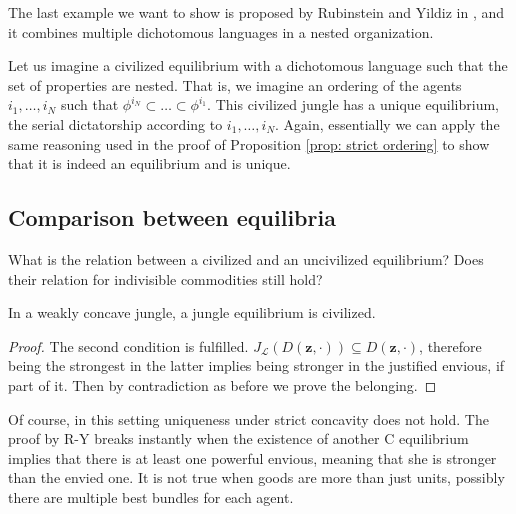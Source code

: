 The last example we want to show is proposed by Rubinstein and Yildiz in \cite[RY]{RY}, and it combines multiple dichotomous languages in a nested organization.

\begin{example}
    Let us imagine a civilized equilibrium with a dichotomous language such that the set of properties are nested. That is, we imagine an ordering of the agents $i_1,\dots,i_N$ such that $\phi^{i_N}\subset\dots\subset\phi^{i_1}$. This civilized jungle has a unique equilibrium, the serial dictatorship according to $i_1,\dots,i_N$. Again, essentially we can apply the same reasoning used in the proof of Proposition \ref{prop: strict ordering} to show that it is indeed an equilibrium and is unique. 
\end{example}

\subsection{Comparison between equilibria}

What is the relation between a civilized and an uncivilized equilibrium? Does their relation for indivisible commodities still hold?

\begin{proposition}\label{Prop: jungle eq is C in weakly concave}
In a weakly concave jungle, a jungle equilibrium is civilized.

    \begin{proof}
        The second condition is fulfilled. $J_{\mathcal{L}}(D(\textbf{z},\cdot))\subseteq D(\textbf{z},\cdot)$, therefore being the strongest in the latter implies being stronger in the justified envious, if part of it. Then by contradiction as before we prove the belonging.
    \end{proof}
\end{proposition}

Of course, in this setting uniqueness under strict concavity does not hold. The proof by R-Y\cite{RY} breaks instantly when the existence of another C equilibrium implies that there is at least one powerful envious, meaning that she is stronger than the envied one. It is not true when goods are more than just units, possibly there are multiple best bundles for each agent.
